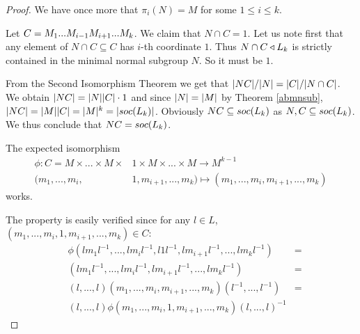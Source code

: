 \begin{proof}
    We have once more that $\pi_i(N) = M$ for some $1 \le i \le k$. 
    
    Let $C = \Mi[1]...\Mi[i-1]\Mi[i+1]...\Mi[k]$. We claim that $N \cap C = 1$. Let us note first that any element of $N \cap C \subseteq C$ has $i$-th coordinate $1$. Thus $N \cap C \nsub L_k$ is strictly contained in the minimal normal subgroup $N$. So it must be $1$.

    From the Second Isomorphism Theorem we get that $\card{NC}/\card{N} = \card{C} / \card{N \cap C}$.
    We obtain $\card{NC} = \card{N}\card{C}\cdot 1$ and since $\card{N} = \card{M}$ by Theorem \ref{abmnsub}, $\card{NC} = \card{M}\card{C} = \card{M}^k = \card{\soc{L_k}}$.
    Obviously $NC \subseteq \soc{L_k}$ as $N,C \subseteq \soc{L_k}$. We thus conclude that $NC = \soc{L_k}$.
    

    The expected isomorphism
    \begin{align*}
        \phi \colon C = M \times ... \times M \times &1 \times M \times ... \times M \longrightarrow M^{k-1} \\
        (m_1,...,m_i,&1,m_{i+1},...,m_{k}) \mapsto (m_1,...,m_i,m_{i+1},...,m_{k})
    \end{align*}
    works. 
    
    The property is easily verified since for any $l \in L$, $(m_1,...,m_i,1,m_{i+1},...,m_{k}) \in C$:
    \begin{align*}
        &\phi(lm_1l^{-1},...,lm_il^{-1},l1l^{-1},lm_{i+1}l^{-1},...,lm_{k}l^{-1}) &= \\
        &(lm_1l^{-1},...,lm_il^{-1},lm_{i+1}l^{-1},...,lm_{k}l^{-1}) &= \\
        &(l,...,l)(m_1,...,m_i,m_{i+1},...,m_{k})(l^{-1},...,l^{-1}) &= \\ 
        &(l,...,l)\phi(m_1,...,m_i,1,m_{i+1},...,m_{k})(l,...,l)^{-1}
    \end{align*}
\end{proof}
